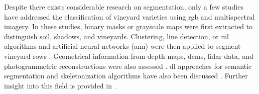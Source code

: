 Despite there exists considerable research on segmentation, only a few studies have addressed the classification of vineyard varieties using \acrshort{rgb} and multispectral imagery. In these studies, binary masks or grayscale maps were first extracted to distinguish soil, shadows, and vineyards. Clustering, line detection, or \acrshort{ml} algorithms and artificial neural networks (\acrshort{ann}) were then applied to segment vineyard rows \cite{fuentes-penailillo_using_2018, karatzinis_towards_2020, hajjar_vine_2021, padua_monitoring_2020, padua_vineyard_2022, poblete-echeverria_detection_2017}. Geometrical information from depth maps, \acrshort{dem}s, \acrshort{lidar} data, and photogrammetric reconstructions were also assessed \cite{kerkech_vine_2020, aguiar_localization_2022, jurado_automatic_2020}. \acrshort{dl} approaches for semantic segmentation and skeletonization algorithms have also been discussed \cite{kerkech_vine_2020-1, barros_multispectral_2022, nolan_automated_2015}. Further insight into this field is provided in \cite{li_performance_2020}. 

